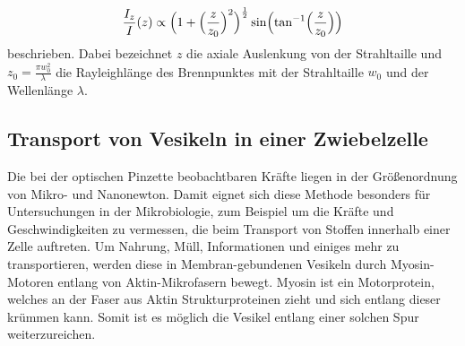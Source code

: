 \begin{equation}
    \frac{I_z}{I}(z)\propto \Bigl( 1 + \Bigl(\frac{z}{z_0}\Bigr)^2 \Bigr)^{\frac{1}{2}}\sin\Bigl(\tan^{-1}\Bigl(\frac{z}{z_0}\Bigr)\Bigr)
    \label{eq:A1}
\end{equation}
beschrieben. Dabei bezeichnet $z$ die axiale Auslenkung von der Strahltaille
und $z_0=\frac{\pi w_0^2}{\lambda}$ die Rayleighlänge des Brennpunktes mit der Strahltaille $w_0$ und der Wellenlänge $\lambda$.
\subsection{Transport von Vesikeln in einer Zwiebelzelle}
Die bei der optischen Pinzette beobachtbaren Kräfte liegen in der Größenordnung von Mikro- und Nanonewton.
Damit eignet sich diese Methode besonders für Untersuchungen in der Mikrobiologie, zum Beispiel um die Kräfte und Geschwindigkeiten zu vermessen,
die beim Transport von Stoffen innerhalb einer Zelle auftreten.
Um Nahrung, Müll, Informationen und einiges mehr zu transportieren,
werden diese in Membran-gebundenen Vesikeln durch Myosin-Motoren entlang von Aktin-Mikrofasern bewegt.
Myosin ist ein Motorprotein, welches an der Faser aus Aktin Strukturproteinen zieht und sich entlang dieser krümmen kann.
Somit ist es möglich die Vesikel entlang einer solchen Spur weiterzureichen.
